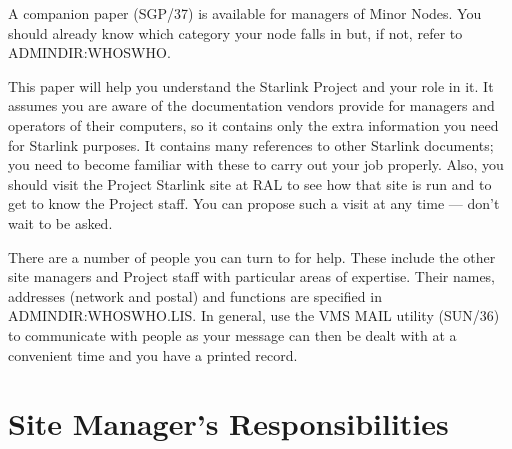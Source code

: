 A companion paper (SGP/37) is available for managers of Minor Nodes.
You should already know which category your node falls in but, if not, refer to
ADMINDIR:WHOSWHO.

This paper will help you understand the Starlink Project and your role in it.
It assumes you are aware of the documentation vendors provide for managers
and operators of their computers, so it contains only the extra information
you need for Starlink purposes.
It contains many references to other Starlink documents; you need to become
familiar with these to carry out your job properly.
Also, you should visit the Project Starlink site at RAL to see how that site is
run and to get to know the Project staff.
You can propose such a visit at any time --- don't wait to be asked.

There are a number of people you can turn to for help.
These include the other site managers and Project staff with particular areas
of expertise.
Their names, addresses (network and postal) and functions are specified in
ADMINDIR:WHOSWHO.LIS.
In general, use the VMS MAIL utility (SUN/36) to communicate with people as
your message can then be dealt with at a convenient time and you have a printed
record.

\section {Site Manager's Responsibilities}

